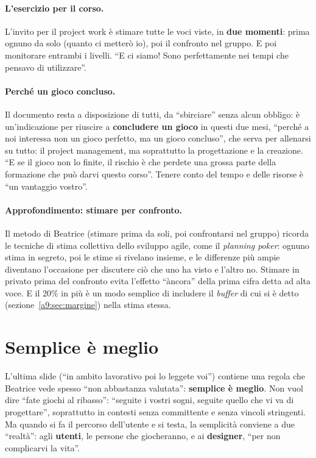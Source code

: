 \paragraph{L'esercizio per il corso.} L'invito per il project work è stimare tutte le
voci viste, in \textbf{due momenti}: prima ognuno da solo (quanto ci metterò io), poi
il confronto nel gruppo. E poi monitorare entrambi i livelli. ``E ci siamo! Sono
perfettamente nei tempi che pensavo di utilizzare''.

\paragraph{Perché un gioco concluso.} Il documento resta a disposizione di tutti,
da ``sbirciare'' senza alcun obbligo: è un'indicazione per riuscire a \textbf{concludere un
gioco} in questi due mesi, ``perché a noi interessa non un gioco perfetto, ma un gioco
concluso'', che serva per allenarsi su tutto: il project management, ma soprattutto
la progettazione e la creazione. ``E se il gioco non lo finite, il rischio è che
perdete una grossa parte della formazione che può darvi questo corso''. Tenere conto
del tempo e delle risorse è ``un vantaggio vostro''.

\paragraph{Approfondimento: stimare per confronto.} Il metodo di Beatrice (stimare
prima da soli, poi confrontarsi nel gruppo) ricorda le tecniche di stima collettiva
dello sviluppo agile, come il \emph{planning poker}: ognuno stima in segreto, poi le
stime si rivelano insieme, e le differenze più ampie diventano l'occasione per
discutere ciò che uno ha visto e l'altro no. Stimare in privato prima del confronto
evita l'effetto ``àncora'' della prima cifra detta ad alta voce. E il 20\% in più è un
modo semplice di includere il \emph{buffer} di cui si è detto
(sezione~\ref{a9:sec:margine}) nella stima stessa.

\section{Semplice è meglio}
\label{a9:sec:semplice}



L'ultima slide (``in ambito lavorativo poi lo leggete voi'') contiene una regola che
Beatrice vede spesso ``non abbastanza valutata'': \textbf{semplice è meglio}. Non vuol
dire ``fate giochi al ribasso'': ``seguite i vostri sogni, seguite quello che vi va di
progettare'', soprattutto in contesti senza committente e senza vincoli stringenti. Ma
quando si fa il percorso dell'utente e si testa, la semplicità conviene a due
``realtà'': agli \textbf{utenti}, le persone che giocheranno, e ai \textbf{designer},
``per non complicarvi la vita''.

